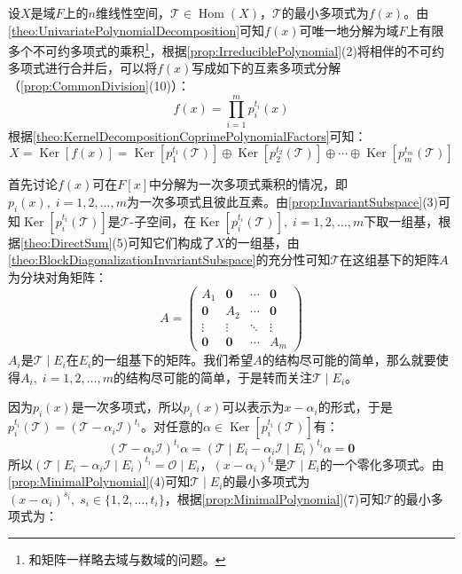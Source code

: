 设$X$是域$F$上的$n$维线性空间，$\mathcal{T}\in\operatorname{Hom}(X)$，$\mathcal{T}$的最小多项式为$f(x)$。由\cref{theo:UnivariatePolynomialDecomposition}可知$f(x)$可唯一地分解为域$F$上有限多个不可约多项式的乘积\footnote{和矩阵一样略去域与数域的问题。}，根据\cref{prop:IrreduciblePolynomial}(2)将相伴的不可约多项式进行合并后，可以将$f(x)$写成如下的互素多项式分解（\cref{prop:CommonDivision}(10)）：
\begin{equation*}
	f(x)=\prod_{i=1}^{m}p_i^{t_i}(x)
\end{equation*}
根据\cref{theo:KernelDecompositionCoprimePolynomialFactors}可知：
\begin{equation*}
	X=\operatorname{Ker}[f(x)]=\operatorname{Ker}[p_1^{t_1}(\mathcal{T})]\oplus\operatorname{Ker}[p_2^{t_2}(\mathcal{T})]\oplus\cdots\oplus\operatorname{Ker}[p_m^{t_m}(\mathcal{T})]
\end{equation*}\par
首先讨论$f(x)$可在$F[x]$中分解为一次多项式乘积的情况，即$p_i(x),\;i=1,2,\dots,m$为一次多项式且彼此互素。由\cref{prop:InvariantSubspace}(3)可知$\operatorname{Ker}[p_i^{t_i}(\mathcal{T})]$是$\mathcal{T}$-子空间，在$\operatorname{Ker}[p_i^{t_i}(\mathcal{T})],\;i=1,2,\dots,m$下取一组基，根据\cref{theo:DirectSum}(5)可知它们构成了$X$的一组基，由\cref{theo:BlockDiagonalizationInvariantSubspace}的充分性可知$\mathcal{T}$在这组基下的矩阵$A$为分块对角矩阵：
\begin{equation*}
	A=
	\begin{pmatrix}
		A_1 &\mathbf{0} & \cdots & \mathbf{0} \\
		\mathbf{0} & A_2 & \cdots & \mathbf{0} \\
		\vdots & \vdots & \ddots & \vdots \\
		\mathbf{0} & \mathbf{0} & \cdots & A_m
	\end{pmatrix} 
\end{equation*}
$A_i$是$\mathcal{T}\mid E_i$在$E_i$的一组基下的矩阵。我们希望$A$的结构尽可能的简单，那么就要使得$A_i,\;i=1,2,\dots,m$的结构尽可能的简单，于是转而关注$\mathcal{T}\mid E_i$。\par
因为$p_i(x)$是一次多项式，所以$p_i(x)$可以表示为$x-\alpha_i$的形式，于是$p_i^{t_i}(\mathcal{T})=(\mathcal{T}-\alpha_i\mathcal{I})^{t_i}$。对任意的$\alpha\in\operatorname{Ker}[p_i^{t_i}(\mathcal{T})]$有：
\begin{equation*}
	(\mathcal{T}-\alpha_i\mathcal{I})^{t_i}\alpha=(\mathcal{T}\mid E_i-\alpha_i\mathcal{I}\mid E_i)^{t_i}\alpha=\mathbf{0}
\end{equation*}
所以$(\mathcal{T}\mid E_i-\alpha_i\mathcal{I}\mid E_i)^{t_i}=\mathcal{O}\mid E_i$，$(x-\alpha_i)^{t_i}$是$\mathcal{T}\mid E_i$的一个零化多项式。由\cref{prop:MinimalPolynomial}(4)可知$\mathcal{T}\mid E_i$的最小多项式为$(x-\alpha_i)^{s_i},\;s_i\in\{1,2,\dots,t_i\}$，根据\cref{prop:MinimalPolynomial}(7)可知$\mathcal{T}$的最小多项式为：
